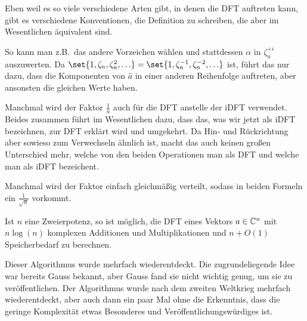 \begin{remark}
    Eben weil es so viele verschiedene Arten gibt, in denen die DFT auftreten kann, gibt es verschiedene Konventionen, die Definition zu schreiben, die aber im Wesentlichen äquivalent sind.

    So kann man z.B.\ das andere Vorzeichen wählen und stattdessen $\alpha$ in $\zeta_n^{+i}$ auszuwerten. Da $\set{1, \zeta_n, \zeta_n^2, \ldots} = \set{1, \zeta_n^{-1}, \zeta_n^{-2}, \ldots}$ ist, führt das nur dazu, dass die Komponenten von $\hat{a}$ in einer anderen Reihenfolge auftreten, aber ansonsten die gleichen Werte haben.

    Manchmal wird der Faktor $\frac{1}{n}$ auch für die DFT anstelle der iDFT verwendet. Beides zusammen führt im Wesentlichen dazu, dass das, was wir jetzt als iDFT bezeichnen, zur DFT erklärt wird und umgekehrt. Da Hin- und Rückrichtung aber sowieso zum Verwechseln ähnlich ist, macht das auch keinen großen Unterschied mehr, welche von den beiden Operationen man als DFT und welche man als iDFT bezeichent.

    Manchmal wird der Faktor einfach gleichmäßig verteilt, sodass in beiden Formeln ein $\frac{1}{\sqrt{n}}$ vorkommt.
\end{remark}

\begin{theorem}
    Ist $n$ eine Zweierpotenz, so ist möglich, die DFT eines Vektors $a\in\mathbb{C}^n$ mit $n\log(n)$ komplexen Additionen und Multiplikationen und $n+O(1)$ Speicherbedarf zu berechnen.
\end{theorem}

\begin{remark}
    Dieser Algorithmus wurde mehrfach wiederentdeckt. Die zugrundeliegende Idee war bereits Gauss bekannt, aber Gauss fand sie nicht wichtig genug, um sie zu veröffentlichen. Der Algorithmus wurde nach dem zweiten Weltkrieg mehrfach wiederentdeckt, aber auch dann ein paar Mal ohne die Erkenntnis, dass die geringe Komplexität etwas Besonderes und Veröffentlichungswürdiges ist.
\end{remark}

